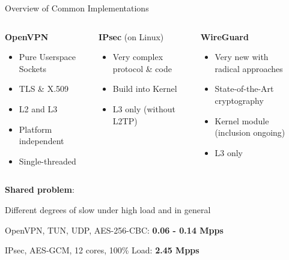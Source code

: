 \documentclass[NET,english]{tumbeamer}
\begin{document}
\begin{frame}{Overview of Common Implementations}
	\begin{columns}[T] %
		\begin{column}{.30\textwidth}
			\textbf{OpenVPN}
			\begin{itemize}
				\item Pure Userspace\\
					Sockets
				\item TLS \& X.509
				\item L2 and L3
				\item Platform independent
				\item Single-threaded
			\end{itemize}
		\end{column}%
		\hfill%
		\begin{column}{.32\textwidth}
			\textbf{IPsec} (on Linux)
			\begin{itemize}
				\item Very complex\\
				protocol \& code
				\item Build into Kernel
				\item L3 only (without L2TP)
			\end{itemize}
		\end{column}%
		\hfill%
		\begin{column}{.35\textwidth}
			\textbf{WireGuard}
			\begin{itemize}
				\item Very new with\\ radical approaches
				\item State-of-the-Art cryptography
				\item Kernel module\\(inclusion ongoing)
				\item L3 only
			\end{itemize}
		\end{column}%
	\end{columns}

	\pause
	\vspace*{0.5em}
	\textbf{Shared problem}:
	
	Different degrees of slow under high load and in general
	
	
	OpenVPN, TUN, UDP, AES-256-CBC: \textbf{0.06 - 0.14 Mpps}
	
	IPsec, AES-GCM, 12 cores, 100\% Load: \textbf{2.45 Mpps}
\end{frame}
\end{document}
